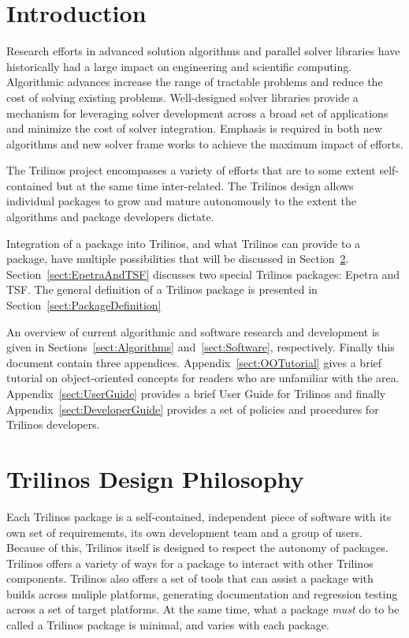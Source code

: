 \documentclass[12pt,strict]{SANDreport}
\begin{document}
\section{Introduction}

Research efforts in advanced solution algorithms and parallel solver
libraries have historically had a large impact on engineering and
scientific computing.  Algorithmic advances increase the range
of tractable problems and reduce the cost of solving existing
problems.  Well-designed solver libraries provide a mechanism for
leveraging solver development across a broad set of applications and
minimize the cost of solver integration.  Emphasis is
required in both new algorithms and new solver frame
works to achieve the maximum impact of efforts.

The Trilinos project encompasses a variety of efforts that are to some
extent self-contained but at the same time inter-related.  The
Trilinos design allows individual packages to grow and mature
autonomously to the extent the algorithms and package developers
dictate. 

Integration of a package into Trilinos, and what Trilinos can provide
to a package, have multiple possibilities
that will be discussed in Section~\ref{sect:TrilinosDesign}.
Section~\ref{sect:EpetraAndTSF} discusses two special Trilinos
packages: Epetra and TSF.  The general definition of a Trilinos
package is presented in Section~\ref{sect:PackageDefinition}

An overview of current algorithmic and software research and
development is given in Sections~\ref{sect:Algorithms}
and~\ref{sect:Software}, respectively.  Finally this document contain
three appendices.  Appendix~\ref{sect:OOTutorial} gives a brief
tutorial on object-oriented concepts for readers who are unfamiliar
with the area.  Appendix~\ref{sect:UserGuide} provides a brief User Guide
for Trilinos and finally Appendix~\ref{sect:DeveloperGuide} provides a
set of policies and procedures for Trilinos developers.

\section{Trilinos Design Philosophy}
\label{sect:TrilinosDesign}
Each Trilinos package is a self-contained, independent piece
of software with its own set of requirememts, its own development team
and a group of users.  Because of this,
Trilinos itself is designed to respect the autonomy of packages.
Trilinos offers a variety of ways for a package to interact with other
Trilinos components.  Trilinos also offers a set of tools that can
assist a package with builds across muliple platforms, generating
documentation and regression testing across a set of target platforms.
At the same time, what a package {\it must} do to be called a Trilinos
package is minimal, and varies with each package.
\end{document}

